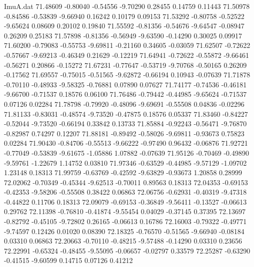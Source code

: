 \begin{filecontents}{ImuA.dat}
  71.48609   -0.80040   -0.54556   -9.70290    0.28455    0.14759    0.11443
  71.50978   -0.84586   -0.53839   -9.66940    0.16242    0.10179    0.09153
  71.53292   -0.80758   -0.52522   -9.65624    0.08609    0.20102    0.19840
  71.55592   -0.81356   -0.54676   -9.64547   -0.08947    0.26209    0.25183
  71.57898   -0.81356   -0.56949   -9.63590   -0.14290    0.30025    0.09917
  71.60200   -0.79083   -0.55753   -9.69811   -0.21160    0.34605   -0.03059
  71.62507   -0.72622   -0.57667   -9.69213   -0.46349    0.21629   -0.12219
  71.64941   -0.72622   -0.55872   -9.66461   -0.56271    0.20866   -0.15272
  71.67231   -0.77647   -0.53719   -9.70768   -0.50165    0.26209   -0.17562
  71.69557   -0.75015   -0.51565   -9.62872   -0.66194    0.10943   -0.07639
  71.71878   -0.70110   -0.48933   -9.58325   -0.76881    0.07890    0.07627
  71.74177   -0.74536   -0.46181   -9.66700   -0.71537    0.18576    0.06100
  71.76486   -0.79442   -0.44985   -9.65624   -0.71537    0.07126    0.02284
  71.78798   -0.79920   -0.48096   -9.69691   -0.55508    0.04836   -0.02296
  71.81133   -0.83031   -0.48574   -9.73520   -0.47875    0.18576    0.05337
  71.83460   -0.84227   -0.52044   -9.73520   -0.66194    0.33842    0.13733
  71.85884   -0.92243   -0.56471   -9.76870   -0.82987    0.74297    0.12207
  71.88181   -0.89492   -0.58026   -9.69811   -0.93673    0.75823    0.02284
  71.90430   -0.84706   -0.55513   -9.66222   -0.97490    0.96432   -0.06876
  71.92721   -0.77049   -0.53839   -9.61675   -1.05886    1.07882   -0.07639
  71.95126   -0.70469   -0.49890   -9.59761   -1.22679    1.14752    0.03810
  71.97346   -0.63529   -0.44985   -9.57129   -1.09702    1.23148    0.18313
  71.99759   -0.63769   -0.42592   -9.63829   -0.93673    1.20858    0.28999
  72.02062   -0.70349   -0.45344   -9.62513   -0.70011    0.89563    0.18313
  72.04353   -0.69153   -0.42353   -9.58206   -0.55508    0.38422    0.06863
  72.06756   -0.62931   -0.40319   -9.47318   -0.44822    0.11706    0.18313
  72.09079   -0.69153   -0.36849   -9.56411   -0.13527   -0.06613    0.29762
  72.11398   -0.76810   -0.41874   -9.55454    0.04029   -0.37145    0.37395
  72.13697   -0.82792   -0.45105   -9.72802    0.26165   -0.06613    0.16786
  72.16003   -0.79322   -0.49771   -9.74597    0.12426    0.01020    0.08390
  72.18325   -0.76570   -0.51565   -9.66940   -0.08184    0.03310    0.06863
  72.20663   -0.70110   -0.48215   -9.57488   -0.14290    0.03310    0.23656
  72.22991   -0.65324   -0.48455   -9.55095   -0.06657   -0.02797    0.33579
  72.25287   -0.63290   -0.41515   -9.60599    0.14715    0.07126    0.41212

\end{filecontents}
